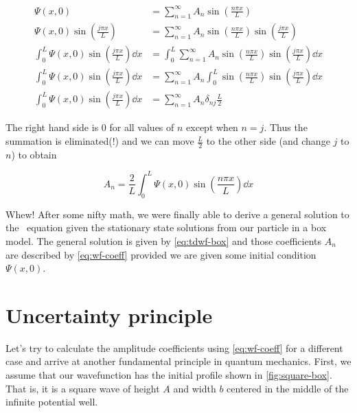 \begin{align*}
	\Psi(x,0) &= \sum_{n=1}^{\infty} A_n \sin \left(\frac{n\pi x}{L} \right) \\
	\Psi(x,0) \sin \left(\frac{j \pi x}{L}\right) &= \sum_{n=1}^{\infty} A_n \sin \left(\frac{n\pi x}{L} \right) \sin \left( \frac{j \pi x}{L}\right) \\
	\int_0^L \Psi(x,0) \sin \left(\frac{j \pi x}{L}\right) \dd{x} &= \int_0^L \sum_{n=1}^{\infty} A_n \sin \left(\frac{n\pi x}{L} \right) \sin \left( \frac{j \pi x}{L}\right) \dd{x} \\
	\int_0^L \Psi(x,0) \sin \left(\frac{j \pi x}{L}\right) \dd{x} &= \sum_{n=1}^{\infty} A_n \int_0^L \sin \left(\frac{n\pi x}{L} \right) \sin \left( \frac{j \pi x}{L}\right) \dd{x} \\
	\int_0^L \Psi(x,0) \sin \left(\frac{j \pi x}{L}\right) \dd{x} &= \sum_{n=1}^{\infty} A_n \delta_{nj} \frac{L}{2}
\end{align*}

The right hand side is 0 for all values of $n$ except when $n = j$. 
Thus the summation is eliminated(!) and we can move $\frac{L}{2}$ to the other side (and change $j$ to $n$) to obtain

\begin{tcolorbox}[title = Wavefunction expansion coefficients] \vspace{-2ex}
	\begin{equation}
		A_n = \frac{2}{L} \int_0^L \Psi(x,0) \sin \left(\frac{n\pi x}{L}\right) \dd{x} \label{eq:wf-coeff}
	\end{equation}
\end{tcolorbox}

Whew! After some nifty math, we were finally able to derive a general solution to the \Sch\ equation given the stationary state solutions from our particle in a box model. 
The general solution is given by \autoref{eq:tdwf-box} and those coefficients $A_n$ are described by \autoref{eq:wf-coeff} provided we are given some initial condition $\Psi(x,0)$.


\section{Uncertainty principle}

Let's try to calculate the amplitude coefficients using \autoref{eq:wf-coeff} for a different case and arrive at another fundamental principle in quantum mechanics. 
First, we assume that our wavefunction has the initial profile shown in \autoref{fig:square-box}. 
That is, it is a square wave of height $A$ and width $b$ centered in the middle of the infinite potential well.

